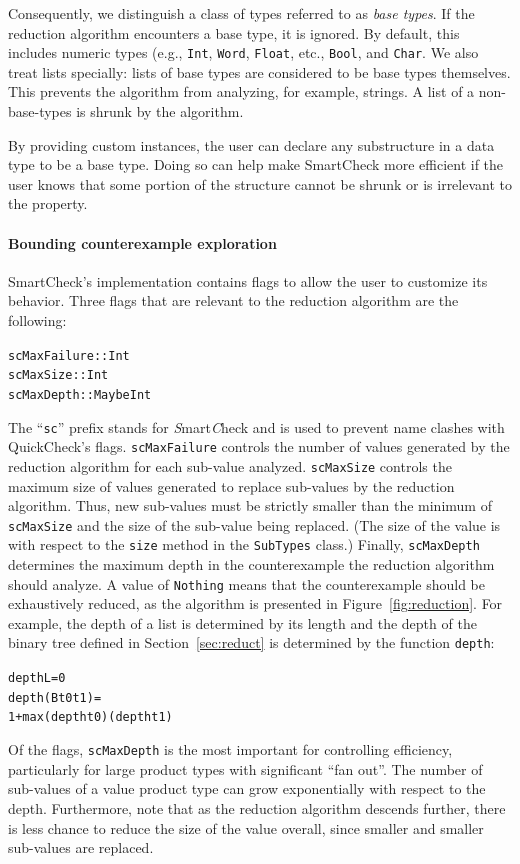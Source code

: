 \documentclass[10pt]{sigplanconf}
\newenvironment{code}{\begin{alltt}}{\end{alltt}}
\newcommand{\ttp}[1]{\texttt{#1}}
\begin{document}
Consequently, we distinguish a class of types referred to as \emph{base types}.
If the reduction algorithm encounters a base type, it is ignored.  By default,
this includes numeric types (e.g., \ttp{Int}, \ttp{Word}, \ttp{Float}, etc.,
\ttp{Bool}, and \ttp{Char}.  We also treat lists specially: lists of base types
are considered to be base types themselves.  This prevents the algorithm from
analyzing, for example, strings.  A list of a non-base-types is shrunk by the
algorithm.

By providing custom instances, the user can declare any substructure in a data
type to be a base type.  Doing so can help make SmartCheck more efficient if the
user knows that some portion of the structure cannot be shrunk or is irrelevant
to the property.

\paragraph{Bounding counterexample exploration}

SmartCheck's implementation contains flags to allow the user to customize its
behavior.  Three flags that are relevant to the reduction algorithm are the
following:
%
\begin{code}
scMaxFailure :: Int
scMaxSize    :: Int
scMaxDepth   :: Maybe Int
\end{code}
%
\noindent
The ``\ttp{sc}'' prefix stands for \emph{S}mart\emph{C}heck and is used to
prevent name clashes with QuickCheck's flags.  \ttp{scMaxFailure} controls the
number of values generated by the reduction algorithm for each sub-value
analyzed.  \ttp{scMaxSize} controls the maximum size of values generated to
replace sub-values by the reduction algorithm.  Thus, new sub-values must be
strictly smaller than the minimum of \ttp{scMaxSize} and the size of the
sub-value being replaced.  (The size of the value is with respect to the
\ttp{size} method in the \ttp{SubTypes} class.)  Finally, \ttp{scMaxDepth}
determines the maximum depth in the counterexample the reduction algorithm
should analyze.  A value of \ttp{Nothing} means that the counterexample should
be exhaustively reduced, as the algorithm is presented in
Figure~\ref{fig:reduction}.  For example, the depth of a list is determined by
its length and the depth of the binary tree defined in Section~\ref{sec:reduct}
is determined by the function \ttp{depth}:
%
\begin{code}
depth L         = 0
depth (B t0 t1) =
  1 + max (depth t0) (depth t1)
\end{code}
%
\noindent
Of the flags, \ttp{scMaxDepth} is the most important for controlling
efficiency, particularly for large product types with significant ``fan out''.
The number of sub-values of a value product type can grow exponentially with
respect to the depth.  Furthermore, note that as the reduction algorithm
descends further, there is less chance to reduce the size of the value overall,
since smaller and smaller sub-values are replaced.
\end{document}
